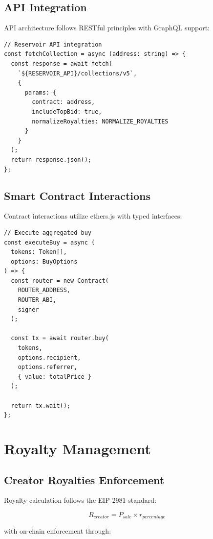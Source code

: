 \documentclass[11pt,a4paper]{article}
\begin{document}
\subsection{API Integration}

API architecture follows RESTful principles with GraphQL support:

\begin{lstlisting}[language=Solidity]
// Reservoir API integration
const fetchCollection = async (address: string) => {
  const response = await fetch(
    `${RESERVOIR_API}/collections/v5`,
    {
      params: {
        contract: address,
        includeTopBid: true,
        normalizeRoyalties: NORMALIZE_ROYALTIES
      }
    }
  );
  return response.json();
};
\end{lstlisting}

\subsection{Smart Contract Interactions}

Contract interactions utilize ethers.js with typed interfaces:

\begin{lstlisting}[language=Solidity]
// Execute aggregated buy
const executeBuy = async (
  tokens: Token[],
  options: BuyOptions
) => {
  const router = new Contract(
    ROUTER_ADDRESS,
    ROUTER_ABI,
    signer
  );
  
  const tx = await router.buy(
    tokens,
    options.recipient,
    options.referrer,
    { value: totalPrice }
  );
  
  return tx.wait();
};
\end{lstlisting}

\section{Royalty Management}

\subsection{Creator Royalties Enforcement}

Royalty calculation follows the EIP-2981 standard:

\begin{equation}
R_{creator} = P_{sale} \times r_{percentage}
\end{equation}

with on-chain enforcement through:
\end{document}
